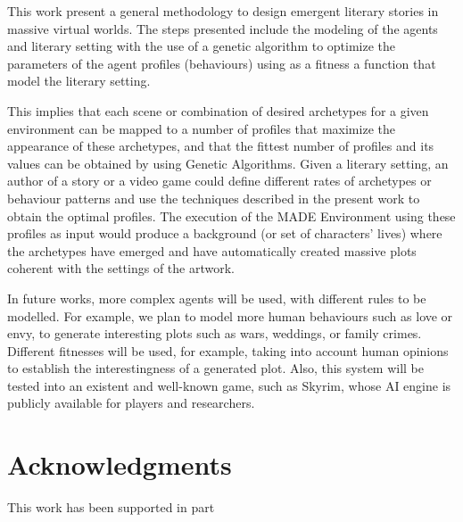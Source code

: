 \documentclass{sig-alternate}
\begin{document}
This work present a general methodology to design emergent literary stories in massive virtual worlds. The steps presented include the modeling of the agents and literary setting with the use of a genetic algorithm to optimize the parameters of the agent profiles (behaviours) using
as a fitness a function that model the literary setting. %

This implies that each scene or combination of desired archetypes for a given
environment can be mapped to a number of profiles that maximize the appearance
of these archetypes, and that the fittest number of profiles and its values can
be obtained by using Genetic Algorithms.  
Given a literary setting, an author of a story or a video game could define 
different rates of archetypes or behaviour patterns and use the techniques described in
the present work to obtain the optimal profiles. The execution of the MADE Environment
using these profiles as input would produce a background (or set of characters' lives)
where the archetypes have emerged and have automatically created massive plots coherent
with the settings of the artwork.

In future works, more complex agents will be used, with different rules to be modelled. For example, we plan to model more human behaviours such as love or envy, to generate interesting plots such as wars, weddings, or family crimes. Different fitnesses will be used, for example, taking into account human opinions to establish the interestingness of a generated plot. Also, this system will be tested into an existent and well-known game, such as Skyrim\texttrademark, whose AI engine is publicly available for players and researchers.



\section{Acknowledgments}
This work has been supported in part %

%



\end{document}
